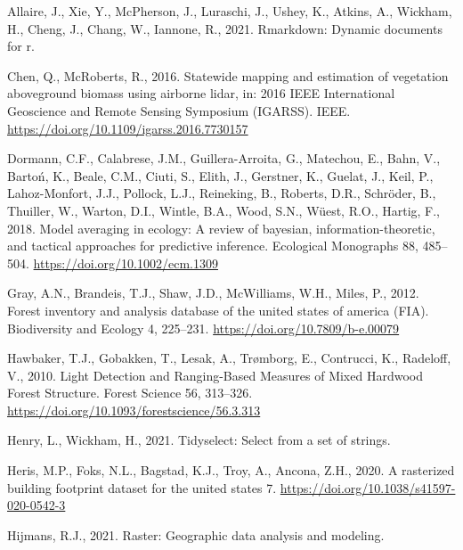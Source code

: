\documentclass[]{elsarticle} %
\newlength{\cslhangindent}
\newenvironment{CSLReferences}[2] %
 {%
  \setlength{\parindent}{0pt}
  \ifodd #1 \everypar{\setlength{\hangindent}{\cslhangindent}}\ignorespaces\fi
  \ifnum #2 > 0
  \setlength{\parskip}{#2\baselineskip}
  \fi
 }%
 {}
\begin{document}
\hypertarget{refs}{}
\begin{CSLReferences}{1}{0}
\leavevmode{}%
Allaire, J., Xie, Y., McPherson, J., Luraschi, J., Ushey, K., Atkins, A., Wickham, H., Cheng, J., Chang, W., Iannone, R., 2021. Rmarkdown: Dynamic documents for r.

\leavevmode{}%
Chen, Q., McRoberts, R., 2016. Statewide mapping and estimation of vegetation aboveground biomass using airborne lidar, in: 2016 {IEEE} International Geoscience and Remote Sensing Symposium ({IGARSS}). {IEEE}. \url{https://doi.org/10.1109/igarss.2016.7730157}

\leavevmode{}%
Dormann, C.F., Calabrese, J.M., Guillera-Arroita, G., Matechou, E., Bahn, V., Bartoń, K., Beale, C.M., Ciuti, S., Elith, J., Gerstner, K., Guelat, J., Keil, P., Lahoz-Monfort, J.J., Pollock, L.J., Reineking, B., Roberts, D.R., Schröder, B., Thuiller, W., Warton, D.I., Wintle, B.A., Wood, S.N., Wüest, R.O., Hartig, F., 2018. Model averaging in ecology: A review of bayesian, information-theoretic, and tactical approaches for predictive inference. Ecological Monographs 88, 485--504. \url{https://doi.org/10.1002/ecm.1309}

\leavevmode{}%
Gray, A.N., Brandeis, T.J., Shaw, J.D., McWilliams, W.H., Miles, P., 2012. Forest inventory and analysis database of the united states of america (FIA). Biodiversity and Ecology 4, 225--231. \url{https://doi.org/10.7809/b-e.00079}

\leavevmode{}%
Hawbaker, T.J., Gobakken, T., Lesak, A., Trømborg, E., Contrucci, K., Radeloff, V., 2010. {Light Detection and Ranging-Based Measures of Mixed Hardwood Forest Structure}. Forest Science 56, 313--326. \url{https://doi.org/10.1093/forestscience/56.3.313}

\leavevmode{}%
Henry, L., Wickham, H., 2021. Tidyselect: Select from a set of strings.

\leavevmode{}%
Heris, M.P., Foks, N.L., Bagstad, K.J., Troy, A., Ancona, Z.H., 2020. A rasterized building footprint dataset for the united states 7. \url{https://doi.org/10.1038/s41597-020-0542-3}

\leavevmode{}%
Hijmans, R.J., 2021. Raster: Geographic data analysis and modeling.


\end{CSLReferences}
\end{document}
